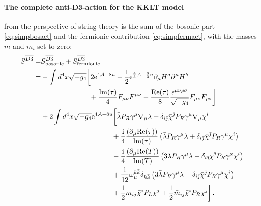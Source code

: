 \documentclass[a4paper,12pt]{report}
\newcommand{\bea}{\begin{equation}\begin{aligned}}
\newcommand{\eea}{\end{aligned}\end{equation}}
\def\rmi{{\rm i}}
\def\rme{{\rm e}}
\def\ib{{\bar \imath}}
\def\jb{{\bar \jmath}}
\def\rmre{{\rm Re}}
\def\rmim{{\rm Im}}
\begin{document}
\paragraph{The complete anti-$\mathbf{D3}$-action for the KKLT model} from the perspective of string theory is the sum of the bosonic part \eqref{eq:simpbosact} and the fermionic contribution \eqref{eq:simpfermact}, with the masses $m$ and $m_i$ set to zero:
\bea 
S^{\overline{D3}} 
=& S^{\overline{D3}}_{\text{bosonic}} + S^{\overline{D3}}_{\text{fermionic}}\\
=& - \int d^4x \sqrt{-g_4} \bigg[ 2 \rme^{4\mathcal{A}-8u} + \frac{1}{2} \rme^{\frac{4}{3} \mathcal{A}-\frac{8}{3}u}\partial_\mu H^a \partial^\mu \bar{H}^{\bar{b}}\\
&\qquad\qquad\qquad\;\;\; + \frac{\rmim(\tau)}{4} F_{\mu\nu}F^{\mu\nu} - \frac{\rmre(\tau)}{8} \frac{\epsilon^{\mu\nu\rho\sigma}}{\sqrt{-g_4}} F_{\mu\nu}F_{\rho\sigma}\bigg]\\
& + 2 \int d^4x \sqrt{-g_4} \rme^{4\mathcal{A}-8u} \bigg[ \bar{\lambda} P_R \gamma^\mu \nabla_\mu \lambda + \delta_{i\jb} \bar{\chi}^\jb P_R \gamma^\mu \nabla_\mu \chi^i\\
&\qquad\qquad\qquad\qquad\qquad + \frac{\rmi}{4} \frac{\left(\partial_\mu \rmre(\tau)\right)}{\rmim(\tau)} \left( \bar{\lambda} P_R \gamma^\mu \lambda + \delta_{i\jb} \bar{\chi}^\jb P_R \gamma^\mu \chi^i\right)\\
&\qquad\qquad\qquad\qquad\qquad - \frac{\rmi}{4} \frac{\left(\partial_\mu \rmre(T)\right)}{\rmim(T)} \left(3 \bar{\lambda} P_R \gamma^\mu \lambda - \delta_{i\jb} \bar{\chi}^\jb P_R \gamma^\mu \chi^i\right)\\
&\qquad\qquad\qquad\qquad\qquad + \frac{1}{12} \omega_\mu^{k\bar{k}} \delta_{k\bar{k}} \left(3 \bar{\lambda} P_R \gamma^\mu \lambda - \delta_{i\jb} \bar{\chi}^\jb P_R \gamma^\mu \chi^i\right)\\
&\qquad\qquad\qquad\qquad\qquad + \frac{1}{2} m_{ij} \bar{\chi}^i P_L \chi^j + \frac{1}{2} \bar{m}_{\ib\jb} \bar{\chi}^\ib P_R \chi^\jb\bigg]\,.
\label{eq:simpbraneact}
\eea
\end{document}

